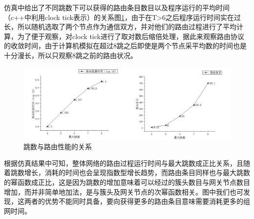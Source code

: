 \documentclass[a4paper,AutoFakeBold,oneside,12pt]{book}
\begin{document}
  仿真中给出了不同跳数下可以获得的路由条目数目以及程序运行的平均时间（c++中利用clock tick表示）的关系图\ref{luyoushumu}，由于在T>6之后程序运行时间实在过长，所以随机选取了两个节点作为通信双方，并对他们的路由过程进行了平均计算，为了便于观察，对clock tick进行了取对数后缩倍处理，据此来观察路由协议的收敛时间，由于计算机模拟在超过8跳之后即使是两个节点采平均数的时间也是十分漫长，所以只观察8跳之前的路由状况。
   \begin{figure}[htbp]
\centering %
\includegraphics[scale=0.3]{pictures/luyoushumu.png} 
\caption{跳数与路由性能的关系} %
\label{luyoushumu}
\end{figure}
  根据仿真结果中可知，整体网络的路由过程运行时间与最大跳数成正比关系，且随着跳数增长，消耗的时间也会呈现指数型增长趋势，而路由条目同样也与最大跳数的幂函数成正比，这是因为跳数的增加意味着可以经过的簇头数目与网关节点数目增加，而并非简单地加法，是与簇头及网关节点的次幂函数相关。图中我们也可发现，这两者的优势不能同时具备，要向获得更多的路由条目意味需要消耗更多的组网时间。
  
\end{document}
